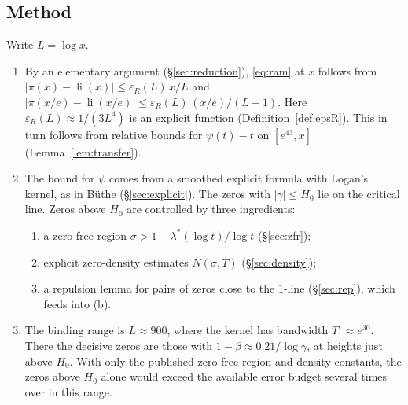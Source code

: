 \documentclass[11pt]{amsart}
\numberwithin{equation}{section}
\theoremstyle{definition}
\theoremstyle{remark}
\newcommand{\li}{\operatorname{li}}
\newcommand{\eps}{\varepsilon}
\begin{document}
\subsection*{Method}
Write $L = \log x$.
\begin{enumerate}
\item By an elementary argument (\S\ref{sec:reduction}), \eqref{eq:ram} at $x$ follows from
  $|\pi(x)-\li(x)| \le \eps_R(L)\,x/L$ and $|\pi(x/e)-\li(x/e)| \le \eps_R(L)\,(x/e)/(L-1)$.
  Here $\eps_R(L) \approx 1/(3L^4)$ is an explicit function (Definition~\ref{def:epsR}).
  This in turn follows from relative bounds for $\psi(t)-t$ on $[e^{43}, x]$ (Lemma~\ref{lem:transfer}).
\item The bound for $\psi$ comes from a smoothed explicit formula with Logan's kernel, as in B\"uthe \cite{Buthe2016,Buthe2018} (\S\ref{sec:explicit}).
  The zeros with $|\gamma| \le H_0$ lie on the critical line.
  Zeros above $H_0$ are controlled by three ingredients:
  \begin{enumerate}
  \item[(a)] a zero-free region $\sigma > 1 - \lambda^*(\log t)/\log t$ (\S\ref{sec:zfr});
  \item[(b)] explicit zero-density estimates $N(\sigma,T)$ (\S\ref{sec:density});
  \item[(c)] a repulsion lemma for pairs of zeros close to the $1$-line (\S\ref{sec:rep}), which feeds into (b).
  \end{enumerate}
\item The binding range is $L \approx 900$, where the kernel has bandwidth $T_1 \approx e^{30}$.
  There the decisive zeros are those with $1-\beta \approx 0.21/\log\gamma$, at heights just above $H_0$.
  With only the published zero-free region and density constants, the zeros above $H_0$ alone would exceed the available error budget several times over in this range.
\end{enumerate}
\end{document}
